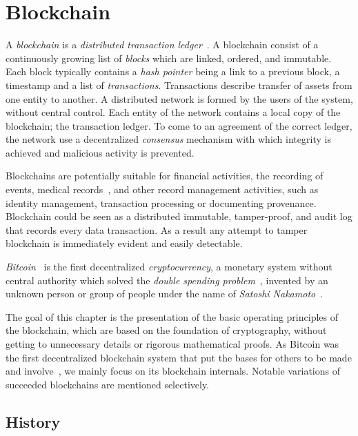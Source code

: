 \chapter{Blockchain}
\label{blockchain}

A \textit{blockchain} is a \textit{distributed transaction ledger}~\cite{nakamoto2012bitcoin}. A blockchain consist of a continuously growing list of \textit{blocks} which are linked, ordered, and immutable. Each block typically contains a \textit{hash pointer} being a link to a previous block, a timestamp and a list of \textit{transactions}. Transactions describe transfer of assets from one entity to another. A distributed network is formed by the users of the system, without central control. Each entity of the network contains a local copy of the blockchain; the transaction ledger. To come to an agreement of the correct ledger, the network use a decentralized \textit{consensus} mechanism with which integrity is achieved and malicious activity is prevented.

Blockchains are potentially suitable for financial activities, the recording of events, medical records~\cite{blockchain_ehr,Azaria2016}, and other record management activities, such as identity management, transaction processing or documenting provenance. Blockchain could be seen as a distributed immutable, tamper-proof, and audit log that records every data transaction. As a result any attempt to tamper blockchain is immediately evident and easily detectable.

\textit{Bitcoin}~\cite{nakamoto2012bitcoin} is the first decentralized \textit{cryptocurrency}, a monetary system without central authority which solved the \textit{double spending problem}~\cite{double_spent, nakamoto2012bitcoin}, invented by an unknown person or group of people under the name of \textit{Satoshi Nakamoto}~\cite{nakamoto2012bitcoin}.

The goal of this chapter is the presentation of the basic operating principles of the blockchain, which are based on the foundation of cryptography, without getting to unnecessary details or rigorous mathematical proofs. As Bitcoin was the first decentralized blockchain system that put the bases for others to be made and involve~\cite{7163021,10.1007/978-3-662-46803-6_10, ethereum_whitepaper}, we mainly focus on its blockchain internals. Notable variations of succeeded blockchains are mentioned selectively.

\section{History}\label{blockchain:history}

